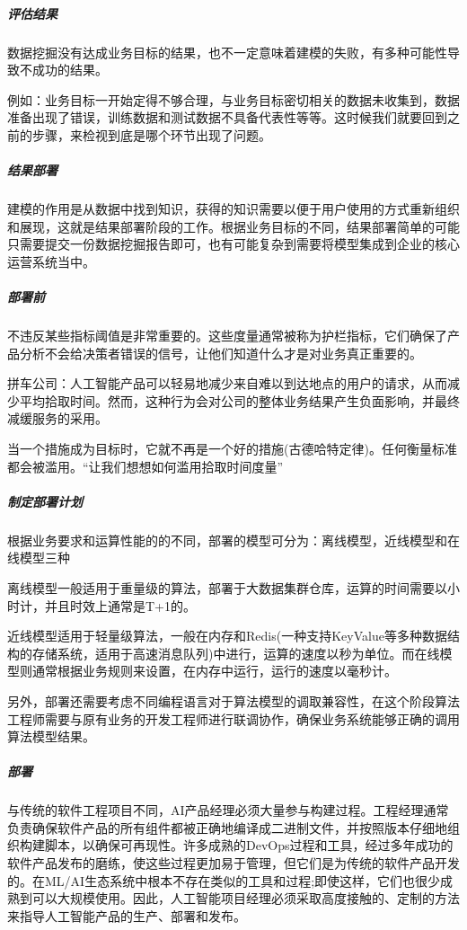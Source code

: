 \documentclass[letterpaper,11pt,english]{sphinxmanual}
\begin{document}
\subparagraph{评估结果}
\label{\detokenize{chapter_project/process:id27}}
数据挖掘没有达成业务目标的结果，也不一定意味着建模的失败，有多种可能性导致不成功的结果。

例如：业务目标一开始定得不够合理，与业务目标密切相关的数据未收集到，数据准备出现了错误，训练数据和测试数据不具备代表性等等。这时候我们就要回到之前的步骤，来检视到底是哪个环节出现了问题。


\subparagraph{结果部署}
\label{\detokenize{chapter_project/process:id28}}
建模的作用是从数据中找到知识，获得的知识需要以便于用户使用的方式重新组织和展现，这就是结果部署阶段的工作。根据业务目标的不同，结果部署简单的可能只需要提交一份数据挖掘报告即可，也有可能复杂到需要将模型集成到企业的核心运营系统当中。


\subparagraph{部署前}
\label{\detokenize{chapter_project/process:id29}}
不违反某些指标阈值是非常重要的。这些度量通常被称为护栏指标，它们确保了产品分析不会给决策者错误的信号，让他们知道什么才是对业务真正重要的。

拼车公司：人工智能产品可以轻易地减少来自难以到达地点的用户的请求，从而减少平均拾取时间。然而，这种行为会对公司的整体业务结果产生负面影响，并最终减缓服务的采用。

当一个措施成为目标时，它就不再是一个好的措施(古德哈特定律)。任何衡量标准都会被滥用。“让我们想想如何滥用拾取时间度量”


\subparagraph{制定部署计划}
\label{\detokenize{chapter_project/process:id30}}
根据业务要求和运算性能的的不同，部署的模型可分为：离线模型，近线模型和在线模型三种

离线模型一般适用于重量级的算法，部署于大数据集群仓库，运算的时间需要以小时计，并且时效上通常是T+1的。

近线模型适用于轻量级算法，一般在内存和Redis(一种支持Key\sphinxhyphen{}Value等多种数据结构的存储系统，适用于高速消息队列)中进行，运算的速度以秒为单位。而在线模型则通常根据业务规则来设置，在内存中运行，运行的速度以毫秒计。

另外，部署还需要考虑不同编程语言对于算法模型的调取兼容性，在这个阶段算法工程师需要与原有业务的开发工程师进行联调协作，确保业务系统能够正确的调用算法模型结果。


\subparagraph{部署}
\label{\detokenize{chapter_project/process:id31}}
与传统的软件工程项目不同，AI产品经理必须大量参与构建过程。工程经理通常负责确保软件产品的所有组件都被正确地编译成二进制文件，并按照版本仔细地组织构建脚本，以确保可再现性。许多成熟的DevOps过程和工具，经过多年成功的软件产品发布的磨练，使这些过程更加易于管理，但它们是为传统的软件产品开发的。在ML/AI生态系统中根本不存在类似的工具和过程;即使这样，它们也很少成熟到可以大规模使用。因此，人工智能项目经理必须采取高度接触的、定制的方法来指导人工智能产品的生产、部署和发布。
\end{document}
